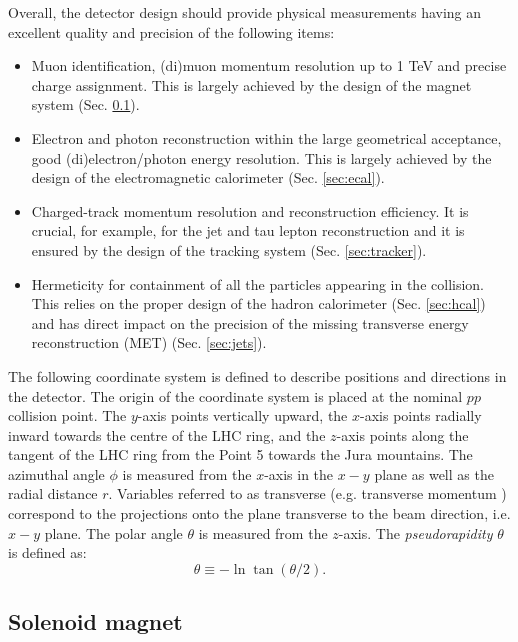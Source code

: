 Overall, the  detector design should provide physical measurements having an excellent quality and precision of the following items:
\begin{itemize}
    \item Muon identification, (di)muon momentum resolution up to 1 TeV and precise charge assignment. This is largely achieved by the design of the magnet system (Sec. \ref{sec:magnet}).
    \item Electron and photon reconstruction within the large geometrical acceptance, good (di)electron/photon energy resolution. This is largely achieved by the design of the electromagnetic calorimeter (Sec. \ref{sec:ecal}).
    \item Charged-track momentum resolution and reconstruction efficiency. It is crucial, for example, for the jet and tau lepton reconstruction and it is ensured by the design of the tracking system (Sec. \ref{sec:tracker}).
    \item Hermeticity for containment of all the particles appearing in the collision. This relies on the proper design of the hadron calorimeter (Sec. \ref{sec:hcal}) and has direct impact on the precision of the missing transverse energy reconstruction (MET) (Sec. \ref{sec:jets}).
\end{itemize}

The following coordinate system is defined to describe positions and directions in the detector. The origin of the coordinate system is placed at the nominal $pp$ collision point. The $y$-axis points vertically upward, the $x$-axis points radially inward towards the centre of the LHC ring, and the $z$-axis points along the tangent of the LHC ring from the Point 5 towards the Jura mountains. The azimuthal angle $\phi$ is measured from the $x$-axis in the $x-y$ plane as well as the radial distance $r$. Variables referred to as transverse (e.g. transverse momentum \pt) correspond to the projections onto the plane transverse to the beam direction, i.e. $x-y$ plane. The polar angle $\theta$ is measured from the $z$-axis. The \textit{pseudorapidity} $\theta$ is defined as:
\begin{equation}
    \theta \equiv -\ln\tan(\theta/2).
\end{equation}

\subsection{Solenoid magnet}\label{sec:magnet}

